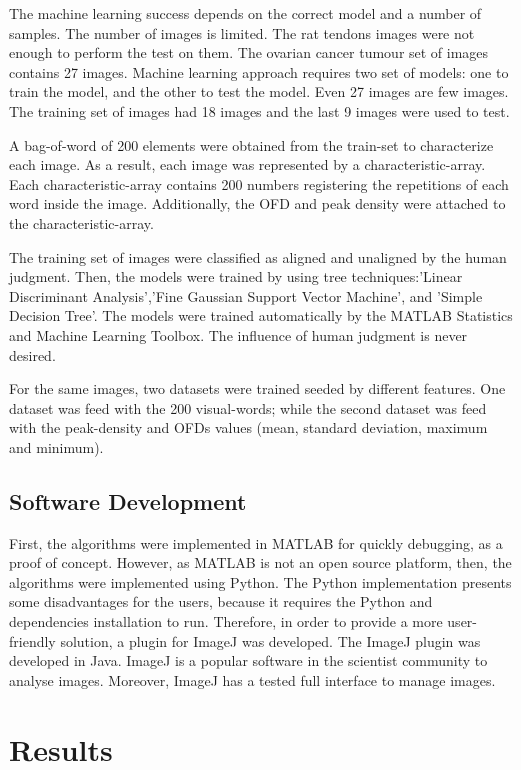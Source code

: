 \documentclass[12pt,a4paper]{article}
\begin{document}
The machine learning success depends on the correct model and a number of samples. The number of images is limited. The rat tendons images were not enough to perform the test on them. The ovarian cancer tumour set of images contains 27 images. Machine learning approach requires two set of models: one to train the model, and the other to test the model. Even 27 images are few images. The training set of images had 18 images and the last 9 images were used to test.

A bag-of-word of 200 elements were obtained from the train-set to characterize each image. As a result, each image was represented by a characteristic-array. Each characteristic-array contains 200 numbers registering the repetitions of each word inside the image. Additionally, the OFD and peak density were attached to the characteristic-array.

The training set of images were classified as aligned and unaligned by the human judgment. Then, the  models were trained by using tree techniques:'Linear Discriminant Analysis','Fine Gaussian Support Vector Machine', and 'Simple Decision Tree'. The models were trained automatically by the MATLAB Statistics and Machine Learning Toolbox.  The influence of human judgment is never desired. 

For the same images, two datasets were trained seeded by different features. One dataset was feed with the 200 visual-words; while the second dataset was feed with the peak-density and OFDs values (mean, standard deviation, maximum and minimum).

\subsection{Software Development}
First, the algorithms were implemented in MATLAB for quickly debugging, as a proof of concept. However, as MATLAB is not an open source platform, then, the algorithms were implemented using Python. The Python implementation presents some disadvantages for the users, because it requires the Python and dependencies installation to run. Therefore, in order to provide a more user-friendly solution, a plugin for ImageJ was developed. The ImageJ plugin was developed in Java. ImageJ is a popular software in the scientist community to analyse images. Moreover, ImageJ has a tested full interface to manage images.

\section{Results}
\end{document}
